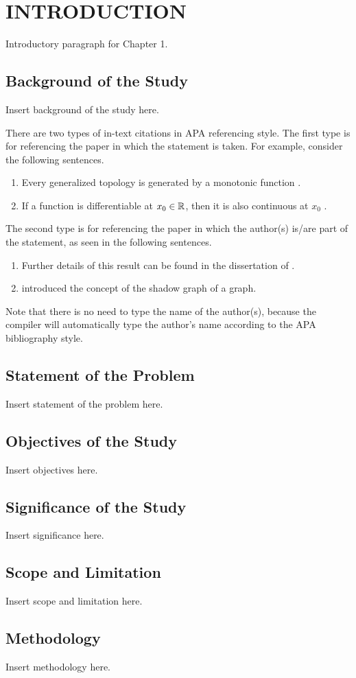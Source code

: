 \chapter{INTRODUCTION}

Introductory paragraph for Chapter 1.

\section{Background of the Study}

Insert background of the study here.

There are two types of in-text citations in APA referencing style. The first type is for referencing the paper in which the statement is taken. For example, consider the following sentences.
\begin{enumerate}
	\item Every generalized topology is generated by a monotonic function \parencite{JlEx}.
	\item If a function is differentiable at $x_0\in\mathbb{R}$, then it is also continuous at $x_0$ \parencite{BkEx}.
\end{enumerate}

The second type is for referencing the paper in which the author(s) is/are part of the statement, as seen in the following sentences.
\begin{enumerate}
	\item Further details of this result can be found in the dissertation of \textcite{ThEx}.
	\item \textcite{bvv11} introduced the concept of the shadow graph of a graph.
\end{enumerate}

Note that there is no need to type the name of the author(s), because the compiler will automatically type the author's name according to the APA bibliography style.

\section{Statement of the Problem}

Insert statement of the problem here.

\section{Objectives of the Study}

Insert objectives here.

\section{Significance of the Study}

Insert significance here.

\section{Scope and Limitation}

Insert scope and limitation here.

\section{Methodology}

Insert methodology here.